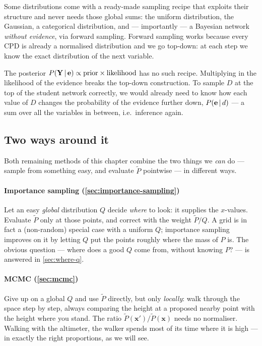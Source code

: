 \documentclass[11pt, oneside]{book}
\newcommand{\Prob}{\mathbb{P}}           %
\newcommand{\given}{\,\vert\,}           %
\newcommand{\bx}{\mathbf{x}}  \newcommand{\by}{\mathbf{y}}
\let\originalsubsection\subsection
\renewcommand{\subsection}{\Needspace{6\baselineskip}\originalsubsection}
\begin{document}
Some distributions come with a ready-made sampling recipe that exploits their
structure and never needs those global sums: the uniform distribution, the
Gaussian, a categorical distribution, and --- importantly --- a Bayesian
network \emph{without evidence}, via forward sampling. Forward sampling works
because every CPD is already a normalised distribution and we go top-down: at
each step we know the exact distribution of the next variable.

The posterior $P(\bY \given \be) \propto \text{prior} \times \text{likelihood}$
has no such recipe. Multiplying in the likelihood of the evidence breaks the
top-down construction. To sample $D$ at the top of the student network
correctly, we would already need to know how each value of $D$ changes the
probability of the evidence further down, $P(\be \given d)$ --- a sum over all
the variables in between, i.e.\ inference again.

\subsection{Two ways around it}

Both remaining methods of this chapter combine the two things we \emph{can}
do --- sample from something easy, and evaluate $\tilde P$ pointwise --- in
different ways.

\paragraph{Importance sampling (\cref{sec:importance-sampling})} Let an easy
\emph{global} distribution $Q$ decide \emph{where} to look: it supplies the
$x$-values. Evaluate $\tilde P$ only at those points, and correct with the
weight $\tilde P/Q$. A grid is in fact a (non-random) special case with a
uniform $Q$; importance sampling improves on it by letting $Q$ put the points
roughly where the mass of $P$ is. The obvious question --- where does a good
$Q$ come from, without knowing $P$? --- is answered in
\cref{sec:where-q}.

\paragraph{MCMC (\cref{sec:mcmc})} Give up on a global $Q$ and use $\tilde P$
directly, but only \emph{locally}: walk through the space step by step, always
comparing the height at a proposed nearby point with the height where you
stand. The ratio $\tilde P(\bx')/\tilde P(\bx)$ needs no normaliser. Walking
with the altimeter, the walker spends most of its time where it is high ---
in exactly the right proportions, as we will see.
\end{document}
